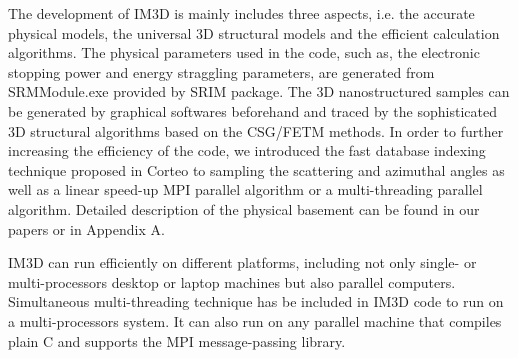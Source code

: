 The development of IM3D is mainly includes three aspects, i.e. the accurate physical models, the universal 3D structural models and the efficient calculation algorithms. The physical parameters used in the code, such as, the electronic stopping power and energy straggling parameters, are generated from SRMModule.exe provided by SRIM package\cite{Ziegler:2010}. The 3D nanostructured samples can be generated by graphical softwares beforehand and traced by the sophisticated 3D structural algorithms based on the CSG/FETM methods\cite{Li:2005,Li:2008,Li:2009,Li2:2011,Zhang:2011,Li:2013}. In order to further increasing the efficiency of the code, we introduced the fast database indexing technique proposed in Corteo\cite{Schiettekatte:2008} to sampling the scattering and azimuthal angles as well as a linear speed-up MPI parallel algorithm or a multi-threading parallel algorithm. Detailed description of the physical basement can be found in our papers or in Appendix A.


IM3D can run efficiently on different platforms, including not only single- or multi-processors desktop or laptop machines but also parallel computers. Simultaneous multi-threading technique has be included in IM3D code to run on a multi-processors system. It can also run on any parallel machine that compiles plain C and supports the MPI message-passing library.

